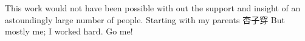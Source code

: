 \begin{CJK*}{UTF8}{gbsn}

This work would not have been possible with out the support and insight of an astoundingly large number of people. Starting with my parents 杏子穿       But mostly me; I worked hard. Go me!

\clearpage\end{CJK*}